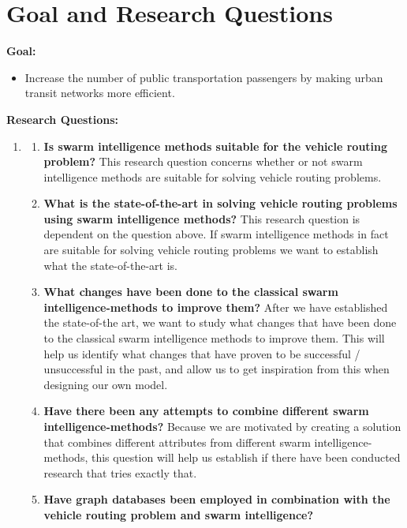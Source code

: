 \section{Goal and Research Questions}
\textbf{Goal:}
\begin{itemize}
\item \label{itm:goal} Increase the number of public transportation passengers by making urban transit networks more efficient.
\end{itemize}
\textbf{Research Questions:}
\begin{enumerate}[label=\textbf{\arabic*})]
\item \label{itm:1}
    \begin{enumerate}
    \item \label{itm:1a} \textbf{Is swarm intelligence methods suitable for the vehicle routing problem?}\newline
    This research question concerns whether or not swarm intelligence methods are suitable for solving vehicle routing problems. 
    \item \label{itm:1b} \textbf{What is the state-of-the-art in solving vehicle routing problems using swarm intelligence methods?}\newline
    This research question is dependent on the question above. If swarm intelligence methods in fact are suitable for solving vehicle routing problems we want to establish what the state-of-the-art is. 
    \item \label{itm:1c} \textbf{What changes have been done to the classical swarm intelligence-methods to improve them?}\newline
    After we have established the state-of-the art, we want to study what changes that have been done to the classical swarm intelligence methods to improve them. This will help us identify what changes that have proven to be successful / unsuccessful in the past, and allow us to get inspiration from this when designing our own model.  
    \item \label{itm:1d}\textbf{Have there been any attempts to combine different swarm intelligence-methods?} \newline
    Because we are motivated by creating a solution that combines different attributes from different swarm intelligence-methods, this question will help us establish if there have been conducted research that tries exactly that. 
    \item \label{itm:1e} \textbf{Have graph databases been employed in combination with the vehicle routing problem and swarm intelligence?}

\end{enumerate}
\end{enumerate}
